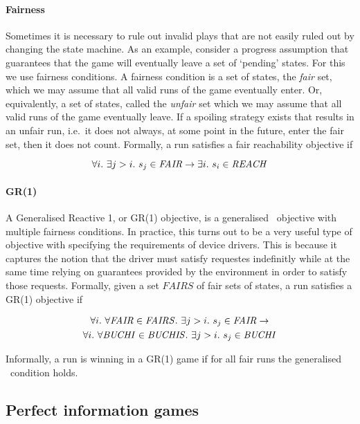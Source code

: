 \paragraph{Fairness}
\label{sec:fairness}
Sometimes it is necessary to rule out invalid plays that are not easily ruled out by changing the state machine. As an example, consider a progress assumption that guarantees that the game will eventually leave a set of `pending' states. For this we use fairness conditions. A fairness condition is a set of states, the \emph{fair} set, which we may assume that all valid runs of the game eventually enter. Or, equivalently, a set of states, called the \emph{unfair} set which we may assume that all valid runs of the game eventually leave. If a spoiling strategy exists that results in an unfair run, i.e.\ it does not always, at some point in the future, enter the fair set, then it does not count. Formally, a run satisfies a fair reachability objective if 

\begin{equation}
\forall i.\ \exists j>i.\ s_j \in \mathit{FAIR} \rightarrow \exists i.\ s_i \in \mathit{REACH}
\end{equation}

\paragraph{GR(1)}
\label{sec:gr1}
A Generalised Reactive 1, or GR(1) \cite{Piterman_PS_06} objective, is a generalised \buchi\ objective with multiple fairness conditions. In practice, this turns out to be a very useful type of objective with specifying the requirements of device drivers. This is because it captures the notion that the driver must satisfy requestes indefinitly while at the same time relying on guarantees provided by the environment in order to satisfy those requests. Formally, given a set $FAIRS$ of fair sets of states, a run satisfies a GR(1) objective if 

\begin{multline}
\forall i.\ \forall \fairobj \in \genfairobj.\ \exists j>i.\ s_j \in \fairobj \rightarrow \\ \forall i.\ \forall \buchiobj \in \genbuchiobj.\ \exists j>i.\ s_j \in \buchiobj
\end{multline}

Informally, a run is winning in a GR(1) game if for all fair runs the generalised \buchi\ condition holds.

\subsection{Perfect information games}

